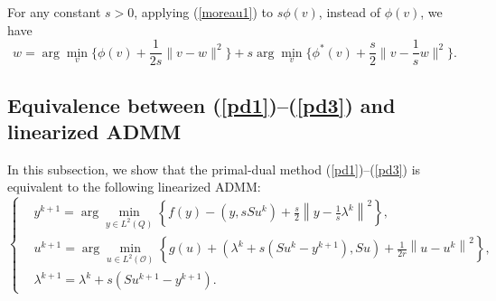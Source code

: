 \documentclass[final]{siamart171218}
\theoremstyle{remark}
\begin{document}
For any constant $s>0$, applying (\ref{moreau1}) to $s\phi(v)$, instead of $\phi(v)$, we have
\begin{equation}
\label{Moreau}
w = \arg\min_v\{\phi(v)+ \frac{1}{2s}\| v - w \|^2\} + s\arg\min_v\{\phi^*(v)+ \frac{s}{2}\| v - \frac{1}{s}w \|^2\}.
\end{equation}






\subsection{Equivalence between (\ref{pd1})--(\ref{pd3})  and linearized ADMM}
In this subsection, we show that the  primal-dual method (\ref{pd1})--(\ref{pd3}) is equivalent to the following linearized ADMM:
\begin{equation}\label{alg}
\left\{\begin{aligned}
& y^{k+1}  = \arg \min_{y \in L^2(Q)}\left\{f(y)-\left(y,  sSu^{k} \right)+ \frac{s}{2}\left\|y- \frac{1}{s}\lambda^k\right\|^{2}\right\}, \\
& u^{k+1}  =\arg \min_{u\in L^2(\mathcal{O})}\left\{g(u)+\left(\lambda^k + s(Su^{k} - y^{k+1}) , S u\right)+\frac{1}{2 r}\left\|u-u^{k}\right\|^{2}\right\},\\
& \lambda^{k+1} = \lambda^k + s(Su^{k+1} - y^{k+1}) .
\end{aligned}\right.\end{equation}
\end{document}
